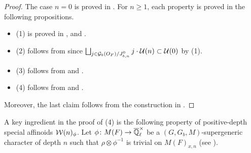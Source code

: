 \documentclass[12pt,reqno]{amsart}
\begin{document}
\begin{proof}   
    The case $n = 0$ is proved in . For $n \geq 1$, each property is proved in the following propositions. 
    \begin{itemize}
        \item (1) is proved in ,  and . 
        \item (2) follows from  since $\bigsqcup_{j \in {\mathcal{G}}_b(O_F) / J^0_{b, n}} j \cdot {\mathcal{U}}(n) \subset {\mathcal{U}}(0)$ by (1). 
        \item (3) follows from  and . 
        \item (4) follows from  and . 
    \end{itemize}
    Moreover, the last claim follows from the construction in . 
\end{proof}

A key ingredient in the proof of (4) is the following property of positive-depth special affinoids ${\mathcal{W}}(n)_\phi$. Let $\phi \colon M(F) \to {\overline{\mathbb{Q}}_\ell^\times}$ be a $(G, G_b, M)$-supergeneric character of depth $n$ such that $\rho \otimes \phi^{-1}$ is trivial on $M(F)_{x, n}$ (see ). 
\end{document}
